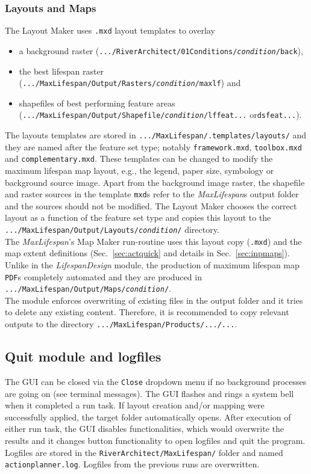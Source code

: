 \subsubsection{Layouts and Maps} \label{sec:actoutmaps}
The Layout Maker uses \texttt{.mxd} layout templates to overlay
\begin{itemize}
	\item a background raster (\texttt{.../RiverArchitect/01{\myUnderscore}Conditions/\textit{condition}/back}),
	\item the best lifespan raster (\texttt{.../MaxLifespan/Output/Rasters/\textit{condition}/max{\myUnderscore}lf}) and
	\item shapefiles of best performing feature areas (\texttt{.../MaxLifespan/Output/Shapefile/\textit{condition}/lf{\myUnderscore}feat...} or\texttt{ds{\myUnderscore}feat...}).
\end{itemize}

The layouts templates are stored in \texttt{.../MaxLifespan/.templates/layouts/} and they are named after the feature set type; notably \texttt{framework.mxd}, \texttt{toolbox.mxd} and \texttt{complementary.mxd}. These templates can be changed to modify the maximum lifespan map layout, e.g., the legend, paper size, symbology or background source image. Apart from the background image raster, the shapefile and raster sources in the template \texttt{mxd}s refer to the \textit{MaxLifespan}s output folder and the sources should not be modified. The Layout Maker chooses the correct layout as a function of the feature set type and copies this layout to the \texttt{.../MaxLifespan/Output/Layouts/\textit{condition}/} directory.\\

The \textit{MaxLifespan}'s Map Maker run-routine uses this layout copy (\texttt{.mxd}) and the map extent definitions (Sec.~\ref{sec:actquick} and details in Sec.~\ref{sec:inpmaps}). Unlike in the \textit{LifespanDesign} module, the production of maximum lifespan map \texttt{PDF}s completely automated and they are produced in \texttt{.../MaxLifespan/Output/Maps/\textit{condition}/}.\\

The module enforces overwriting of existing files in the output folder and it tries to delete any existing content. Therefore, it is recommended to copy relevant outputs to the directory \texttt{.../MaxLifespan/Products/.../...}.

\subsection{Quit module and logfiles}
The GUI can be closed via the \texttt{Close} dropdown menu if no background processes are going on (see terminal messages). The GUI flashes and rings a system bell when it completed a run task. If layout creation and/or mapping were successfully applied, the target folder automatically opens. After execution of either run task, the GUI disables functionalities, which would overwrite the results and it changes button functionality to open logfiles and quit the program. Logfiles are stored in the \texttt{RiverArchitect/MaxLifespan/} folder and named \texttt{action{\myUnderscore}planner.log}. Logfiles from the previous runs are overwritten.


